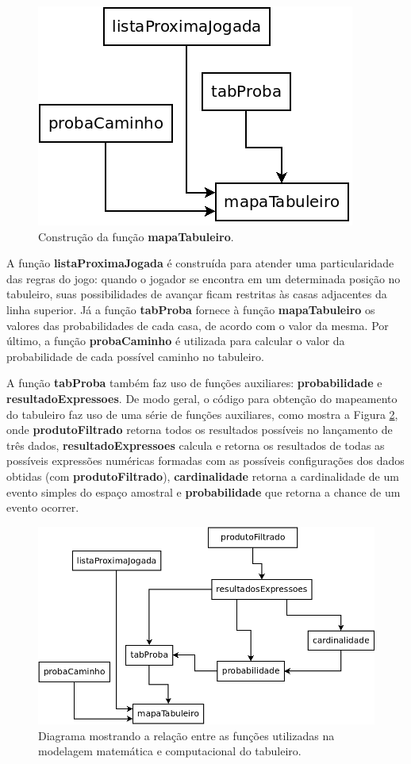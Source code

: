 \documentclass[12pt]{article}
\begin{document}
\begin{figure}[ht]
	\centering
	\includegraphics[width=0.45\linewidth]{img/construcao_mapaTabuleiro.png}
	\caption{Construção da função \textbf{mapaTabuleiro}.}
	\label{construcao_mapaTabuleiro}
\end{figure}

A função \textbf{listaProximaJogada} é construída para atender uma particularidade das regras do jogo: quando o jogador se encontra em um determinada posição no tabuleiro, suas possibilidades de avançar ficam restritas às casas adjacentes da linha superior. Já a função \textbf{tabProba} fornece à função \textbf{mapaTabuleiro} os valores das probabilidades de cada casa, de acordo com o valor da mesma. Por último, a função \textbf{probaCaminho} é utilizada para calcular o valor da probabilidade de cada possível caminho no tabuleiro.

A função \textbf{tabProba} também faz uso de funções auxiliares: \textbf{probabilidade} e \textbf{resultadoExpressoes}. De modo geral, o código para obtenção do mapeamento do tabuleiro faz uso de uma série de funções auxiliares, como mostra a Figura \ref{funcoes_auxiliares_mapaTabuleiro}, onde \textbf{produtoFiltrado} retorna todos os resultados possíveis no lançamento de três dados, \textbf{resultadoExpressoes} calcula e retorna os resultados de todas as possíveis expressões numéricas formadas com as possíveis configurações dos dados obtidas (com \textbf{produtoFiltrado}), \textbf{cardinalidade} retorna a cardinalidade de um evento simples do espaço amostral e \textbf{probabilidade} que retorna a chance de um evento ocorrer.

\begin{figure}[ht]
	\centering
	\includegraphics[width=0.9\linewidth]{img/funcoes_auxiliares_mapaTabuleiro.png}
	\caption{Diagrama mostrando a relação entre as funções utilizadas na modelagem matemática e computacional do tabuleiro.}
	\label{funcoes_auxiliares_mapaTabuleiro}
\end{figure}
\end{document}
